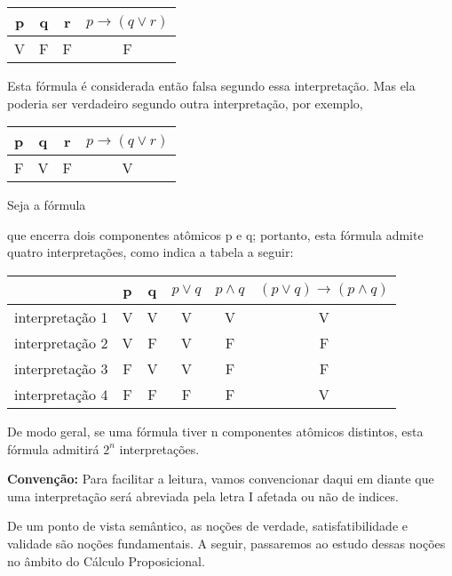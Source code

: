 \begin{center}
    \begin{tabular}{c c c c}
        p & q & r & $p \to (q \lor r)$ \\ \hline
        V & F & F & F
    \end{tabular}
\end{center}

Esta fórmula é considerada então falsa segundo essa interpretação. Mas ela poderia ser verdadeiro segundo outra interpretação, por exemplo,

\begin{center}
    \begin{tabular}{c c c c}
        p & q & r & $p \to (q \lor r)$ \\ \hline
        F & V & F & V
    \end{tabular}
\end{center}

\begin{exemplo}
    Seja a fórmula 
\end{exemplo}
\noindent que encerra dois componentes atômicos p e q; portanto, esta fórmula admite quatro interpretações, como indica a tabela a seguir:

\begin{center}
    \begin{tabular}{c c c c c c}
                        & p & q & $p \lor q$ & $p \land q$ & $(p \lor q) \to (p \land q)$ \\ \hline
        interpretação 1 & V & V & V          & V            & V \\
        interpretação 2 & V & F & V          & F            & F \\
        interpretação 3 & F & V & V          & F            & F \\
        interpretação 4 & F & F & F          & F            & V
    \end{tabular}
\end{center}

De modo geral, se uma fórmula tiver n componentes atômicos distintos, esta fórmula admitirá $2^n$ interpretações.

\bigskip
\noindent
\textbf{Convenção:} Para facilitar a leitura, vamos convencionar daqui em diante que uma interpretação será abreviada pela letra I afetada ou não de indices.

De um ponto de vista semântico, as noções de verdade, satisfatibilidade e validade são noções fundamentais.
A  seguir, passaremos ao  estudo dessas noções no  âmbito do  Cálculo Proposicional.

